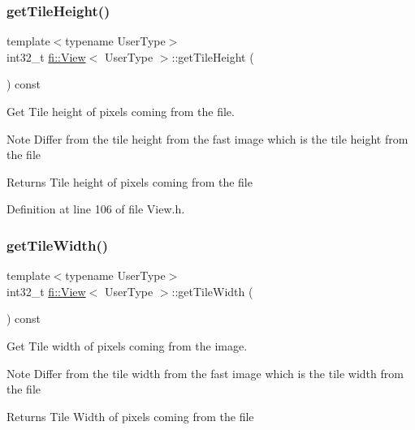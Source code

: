\subsubsection{\texorpdfstring{get\+Tile\+Height()}{getTileHeight()}}
{\footnotesize\ttfamily template$<$typename User\+Type$>$ \\
int32\+\_\+t \hyperlink{classfi_1_1View}{fi\+::\+View}$<$ User\+Type $>$\+::get\+Tile\+Height (\begin{DoxyParamCaption}{ }\end{DoxyParamCaption}) const\hspace{0.3cm}{\ttfamily [inline]}}



Get Tile height of pixels coming from the file. 

\begin{DoxyNote}{Note}
Differ from the tile height from the fast image which is the tile height from the file 
\end{DoxyNote}
\begin{DoxyReturn}{Returns}
Tile height of pixels coming from the file 
\end{DoxyReturn}


Definition at line 106 of file View.\+h.

\mbox{\label{classfi_1_1View_a0bfbcd904e7ed80b9f4ed92403825fc4}} 
\subsubsection{\texorpdfstring{get\+Tile\+Width()}{getTileWidth()}}
{\footnotesize\ttfamily template$<$typename User\+Type$>$ \\
int32\+\_\+t \hyperlink{classfi_1_1View}{fi\+::\+View}$<$ User\+Type $>$\+::get\+Tile\+Width (\begin{DoxyParamCaption}{ }\end{DoxyParamCaption}) const\hspace{0.3cm}{\ttfamily [inline]}}



Get Tile width of pixels coming from the image. 

\begin{DoxyNote}{Note}
Differ from the tile width from the fast image which is the tile width from the file 
\end{DoxyNote}
\begin{DoxyReturn}{Returns}
Tile Width of pixels coming from the file 
\end{DoxyReturn}


